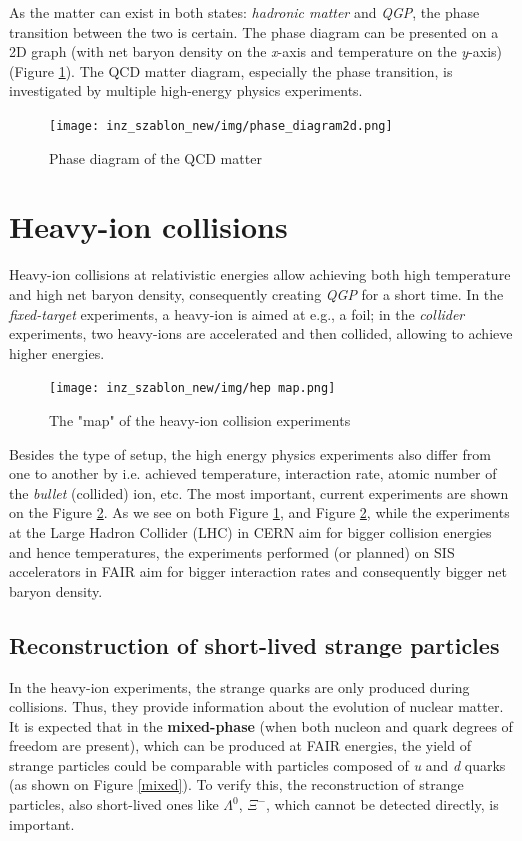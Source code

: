  As the matter can exist in both states: \emph{hadronic matter} and \emph{QGP}, the phase transition between the two is certain. The phase diagram can be presented on a 2D graph (with net baryon density on the \emph{x}-axis and temperature on the \emph{y}-axis) (Figure \ref{phase 2d}). The QCD matter diagram, especially the phase transition, is investigated by multiple high-energy physics experiments.
 \begin{figure}[H]
 \centering
    \centering
    \texttt{[image: inz\_szablon\_new/img/phase\_diagram2d.png]}
    \caption{Phase diagram of the QCD matter  \cite{progress report}}
    \label{phase 2d}
    \vspace{0.3cm}
\end{figure}
\section{Heavy-ion collisions}
Heavy-ion collisions at relativistic energies allow achieving both high temperature and high net baryon density, consequently  creating \emph{QGP} for a short time. In the \emph{fixed-target} experiments, a heavy-ion is aimed at e.g., a foil; in the \emph{collider} experiments, two heavy-ions are accelerated and then collided, allowing to achieve higher energies.

\begin{figure}[H]
    \centering
    \texttt{[image: inz\_szablon\_new/img/hep map.png]}
    \caption{The "map" of the heavy-ion collision experiments \cite{hep map}}
    \label{hep experiments}
 \end{figure}

Besides the type of setup, the high energy physics experiments also differ from one to another by i.e. achieved temperature, interaction rate, atomic number of the \emph{bullet} (collided) ion, etc. The most important, current experiments are shown on the Figure \ref{hep experiments}. As we see on both Figure \ref{phase 2d}, and Figure \ref{hep experiments}, while the experiments at the Large Hadron Collider (LHC) in CERN aim for bigger collision energies and hence temperatures\cite{alice}, the experiments performed (or planned) on SIS accelerators in FAIR aim for bigger interaction rates and consequently bigger net baryon density\cite{sis}.

\subsection{Reconstruction of short-lived strange particles}
In the heavy-ion experiments, the strange quarks are only produced during collisions. Thus, they provide information about the evolution of nuclear matter. It is expected\cite{deconfinement} that in the \textbf{mixed-phase} (when both nucleon and quark degrees of freedom are present), which can be produced at FAIR energies, the yield of strange particles could be comparable with particles composed of \emph{u} and \emph{d} quarks (as shown on Figure \ref{mixed}). To verify this, the reconstruction of strange particles, also short-lived ones  like \textit{$\Lambda^0$}, \textit{$\Xi^-$}, \PKzS which cannot be detected directly, is important.

